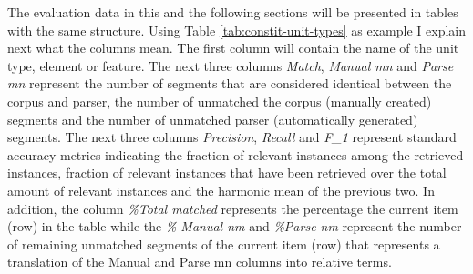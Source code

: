 The evaluation data in this and the following sections will be presented in tables with the same structure. Using Table \ref{tab:constit-unit-types} as example I explain next what the columns mean. The first column will contain the name of the unit type, element or feature. The next three columns \textit{Match}, \textit{Manual mn} and \textit{Parse mn} represent the number of segments that are considered identical between the corpus and parser, the number of unmatched the corpus (manually created) segments and the number of unmatched parser (automatically generated) segments. The next three columns \textit{Precision}, \textit{Recall} and \textit{F_1} represent standard accuracy metrics indicating the fraction of relevant instances among the retrieved instances, fraction of relevant instances that have been retrieved over the total amount of relevant instances and the harmonic mean of the previous two. In addition, the column \textit{\%Total matched} represents the percentage the current item (row) in the table while the \textit{\% Manual nm} and \textit{\%Parse nm} represent the number of remaining unmatched segments of the current item (row) that represents a translation of the Manual and Parse mn columns into relative terms. 

